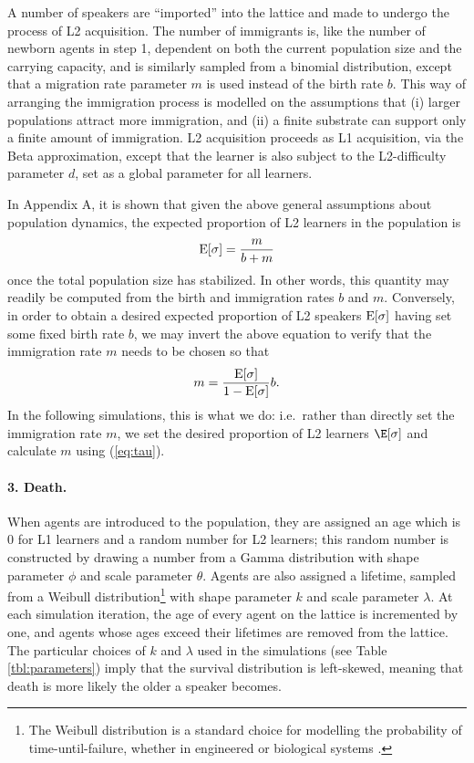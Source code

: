 A number of speakers are ``imported'' into the lattice and made to
undergo the process of L2 acquisition. The number of immigrants is, like
the number of newborn agents in step 1, dependent on both the current
population size and the carrying capacity, and is similarly sampled from
a binomial distribution, except that a migration rate parameter \(m\) is
used instead of the birth rate \(b\). This way of arranging the
immigration process is modelled on the assumptions that (i) larger
populations attract more immigration, and (ii) a finite substrate can
support only a finite amount of immigration. L2 acquisition proceeds as
L1 acquisition, via the Beta approximation, except that the learner is
also subject to the L2-difficulty parameter \(d\), set as a global
parameter for all learners.

In Appendix A, it is shown that given the above general assumptions
about population dynamics, the expected proportion of L2 learners in the
population is \begin{equation}
\textnormal{E}[\sigma] = \frac{m}{b + m}
\label{eq:E-sigma}\end{equation} once the total population size has
stabilized. In other words, this quantity may readily be computed from
the birth and immigration rates \(b\) and \(m\). Conversely, in order to
obtain a desired expected proportion of L2 speakers
\(\textnormal{E}[\sigma]\) having set some fixed birth rate \(b\), we
may invert the above equation to verify that the immigration rate \(m\)
needs to be chosen so that \begin{equation}
m = \frac{\textnormal{E}[\sigma]}{1 - \textnormal{E}[\sigma]} b.
\label{eq:tau}\end{equation} In the following simulations, this is what
we do: i.e.~rather than directly set the immigration rate \(m\), we set
the desired proportion of L2 learners \(\E[\sigma]\) and calculate \(m\)
using (\ref{eq:tau}).

\paragraph*{3. Death.}

When agents are introduced to the population, they are assigned an age
which is 0 for L1 learners and a random number for L2 learners; this
random number is constructed by drawing a number from a Gamma
distribution with shape parameter \(\phi\) and scale parameter
\(\theta\). Agents are also assigned a lifetime, sampled from a Weibull
distribution\footnote{The Weibull distribution is a standard choice for
  modelling the probability of time-until-failure, whether in engineered
  or biological systems \autocite[see][155--156]{Samaniego2014}.} with
shape parameter \(k\) and scale parameter \(\lambda\). At each
simulation iteration, the age of every agent on the lattice is
incremented by one, and agents whose ages exceed their lifetimes are
removed from the lattice. The particular choices of \(k\) and
\(\lambda\) used in the simulations (see Table \ref{tbl:parameters})
imply that the survival distribution is left-skewed, meaning that death
is more likely the older a speaker becomes.

